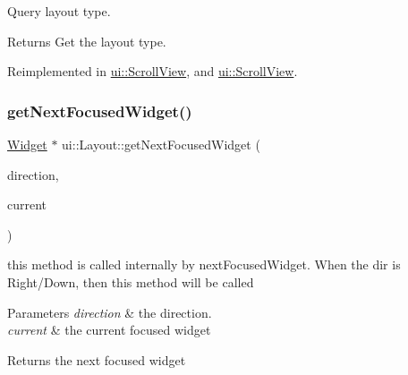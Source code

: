 Query layout type. \begin{DoxyReturn}{Returns}
Get the layout type. 
\end{DoxyReturn}


Reimplemented in \hyperlink{classui_1_1ScrollView_a580fc58c93a299b55fc3c25ab96d22cf}{ui\+::\+Scroll\+View}, and \hyperlink{classui_1_1ScrollView_a437befb0a341d9f9c2278e3f119a1af7}{ui\+::\+Scroll\+View}.

\mbox{\label{classui_1_1Layout_ac1b7e6f28ae57fd9f8921f325c22bb64}} 
\subsubsection{\texorpdfstring{get\+Next\+Focused\+Widget()}{getNextFocusedWidget()}\hspace{0.1cm}{\footnotesize\ttfamily [1/2]}}
{\footnotesize\ttfamily \hyperlink{classui_1_1Widget}{Widget} $\ast$ ui\+::\+Layout\+::get\+Next\+Focused\+Widget (\begin{DoxyParamCaption}\item[{\hyperlink{classui_1_1Widget_a8ae8e8fc793a04a87584205cd1e8a8a5}{Focus\+Direction}}]{direction,  }\item[{\hyperlink{classui_1_1Widget}{Widget} $\ast$}]{current }\end{DoxyParamCaption})\hspace{0.3cm}{\ttfamily [protected]}}

this method is called internally by next\+Focused\+Widget. When the dir is Right/\+Down, then this method will be called 
\begin{DoxyParams}{Parameters}
{\em direction} & the direction. \\
\hline
{\em current} & the current focused widget \\
\hline
\end{DoxyParams}
\begin{DoxyReturn}{Returns}
the next focused widget 
\end{DoxyReturn}
\mbox{\label{classui_1_1Layout_a0f108cfb92f237c056d8f61e3f6e3ca5}} 
